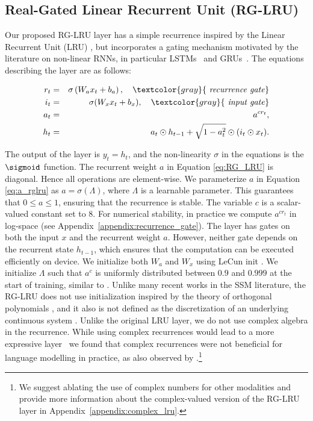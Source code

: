 \subsection{Real-Gated Linear Recurrent Unit (RG-LRU)}
\label{sec:RGLRU}
Our proposed RG-LRU layer has a simple recurrence inspired by the Linear Recurrent Unit (LRU) \citep{orvieto2023resurrecting}, but incorporates a gating mechanism motivated by the literature on non-linear RNNs, in particular LSTMs~\citep{hochreiter1997long} and GRUs~\citep{chung2014empirical}. The equations describing the layer are as follows:

\begin{eqnarray}
 r_t &=& \sigma\left(W_a x_t + b_a\right), \quad \textcolor{gray}{\text{ \emph{recurrence gate}}} \label{eq:recurrent_gate} \\
 i_t & = & \sigma(W_x x_t + b_x), \quad \textcolor{gray}{\text{\emph{ input gate}}} \label{eq:input_gate}\\
a_t &=& a^{c r_t}, \label{eq:a_rglru} \\
h_{t} &=& a_t \odot h_{t-1} + \sqrt{1-a_t^2} \odot (i_t \odot x_t).
\label{eq:RG_LRU}
\end{eqnarray}

The output of the layer is $y_t = h_t$, and the non-linearity $\sigma$ in the equations is the $\sigmoid$ function. The recurrent weight $a$ in Equation \eqref{eq:RG_LRU} is diagonal. Hence all operations are element-wise. We parameterize $a$ in Equation \eqref{eq:a_rglru} as $a = \sigma(\Lambda)$, where $\Lambda$ is a learnable parameter. This guarantees that $0 \leq a \leq 1$, ensuring that the recurrence is stable. The variable $c$ is a scalar-valued constant set to $8$. For numerical stability, in practice we compute $a^{cr_t}$ in log-space (see Appendix~\ref{appendix:recurrence_gate}).
The layer has gates on both the input $x$ and the recurrent weight $a$. However, neither gate depends on the recurrent state $h_{t-1}$, which ensures that the computation can be executed efficiently on device. We initialize both $W_a$ and $W_x$ using LeCun init \citep{lecun2002efficient}. We initialize $\Lambda$ such that $a^c$ is uniformly distributed between $0.9$ and $0.999$ at the start of training, similar to \cite{orvieto2023resurrecting}. Unlike many recent works in the SSM literature, the RG-LRU does not use initialization inspired by the theory of orthogonal polynomials \citep{gu2020hippo}, and it also is not defined as the discretization of an underlying continuous system \citep{gu2021efficiently}. Unlike the original LRU layer, we do not use complex algebra in the recurrence. While using complex recurrences would lead to a more expressive layer~\citep{orvieto2023universality} we found that complex recurrences were not beneficial for language modelling in practice, as also observed by \citet{gu2023mamba}.\footnote{We suggest ablating the use of complex numbers for other modalities and provide more information about the complex-valued version of the RG-LRU layer in Appendix~\ref{appendix:complex_lru}.} 

